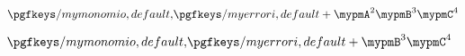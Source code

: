 \documentclass[10pt,a4paper]{article}
\begin{document}
$\PM{1}{2}{3}{4}$	

$\PM{1}{0}{3}{4}$
\end{document}
